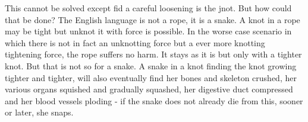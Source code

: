 This cannot be solved except fid a careful loosening is the jnot. But how could that be done? The English language is not a rope, it is a snake. A knot in a rope may be tight but unknot it with force is possible. In the worse case scenario in which there is not in fact an unknotting force but a ever more knotting tightening force, the rope suffers no harm. It stays as it is but only with a tighter knot. But that is not so for a snake. A snake in a knot finding the knot growing tighter and tighter, will also eventually find her bones and skeleton crushed, her various organs squished and gradually squashed, her digestive duct compressed and her blood vessels ploding - if the snake does not already die from this, sooner or later, she snaps. 